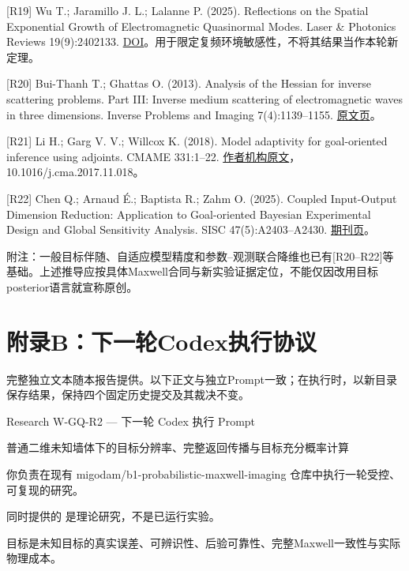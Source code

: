 \documentclass[
  10pt,
  a4paper,
]{article}
\begin{document}
{[}R19{]} Wu T.; Jaramillo J. L.; Lalanne P. (2025). Reflections on the
Spatial Exponential Growth of Electromagnetic Quasinormal Modes. Laser
\& Photonics Reviews 19(9):2402133.
\href{https://doi.org/10.1002/lpor.202402133}{DOI}。用于限定复频环境敏感性，不将其结果当作本轮新定理。

{[}R20{]} Bui-Thanh T.; Ghattas O. (2013). Analysis of the Hessian for
inverse scattering problems. Part III: Inverse medium scattering of
electromagnetic waves in three dimensions. Inverse Problems and Imaging
7(4):1139--1155.
\href{https://www.aimsciences.org/article/doi/10.3934/ipi.2013.7.1139}{原文页}。

{[}R21{]} Li H.; Garg V. V.; Willcox K. (2018). Model adaptivity for
goal-oriented inference using adjoints. CMAME 331:1--22.
\href{https://dspace.mit.edu/entities/publication/af315104-eec6-4542-a3f4-bc37b9a3a16d}{作者机构原文}，10.1016/j.cma.2017.11.018。

{[}R22{]} Chen Q.; Arnaud É.; Baptista R.; Zahm O. (2025). Coupled
Input-Output Dimension Reduction: Application to Goal-oriented Bayesian
Experimental Design and Global Sensitivity Analysis. SISC
47(5):A2403--A2430.
\href{https://epubs.siam.org/doi/10.1137/24M1670421}{期刊页}。

附注：一般目标伴随、自适应模型精度和参数--观测联合降维也已有{[}R20--R22{]}等基础。上述推导应按具体Maxwell合同与新实验证据定位，不能仅因改用目标posterior语言就宣称原创。

\clearpage
\setlength{\parskip}{3pt}

\hypertarget{ux9644ux5f55bux4e0bux4e00ux8f6ecodexux6267ux884cux534fux8bae}{%
\section{附录B：下一轮Codex执行协议}\label{ux9644ux5f55bux4e0bux4e00ux8f6ecodexux6267ux884cux534fux8bae}}

完整独立文本随本报告提供。以下正文与独立Prompt一致；在执行时，以新目录保存结果，保持四个固定历史提交及其裁决不变。

Research W-GQ-R2 --- 下一轮 Codex 执行 Prompt

普通二维未知墙体下的目标分辨率、完整返回传播与目标充分概率计算

你负责在现有 migodam/b1-probabilistic-maxwell-imaging
仓库中执行一轮受控、可复现的研究。

同时提供的 
是理论研究，不是已运行实验。

目标是未知目标的真实误差、可辨识性、后验可靠性、完整Maxwell一致性与实际物理成本。
\end{document}
